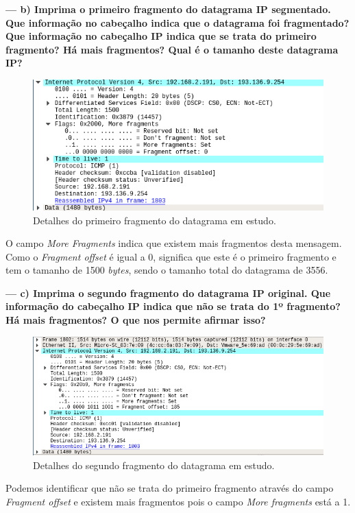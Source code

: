 \documentclass[a4paper]{article}
\begin{document}
\vspace{1cm}

\textbf{--- b) Imprima o primeiro fragmento do datagrama IP segmentado. Que informação no cabeçalho indica que o datagrama foi fragmentado? Que informação no cabeçalho IP indica que se trata do primeiro fragmento? Há mais fragmentos? Qual é o tamanho deste datagrama IP?}\newline
\begin{figure}[!htb]
    \centering
    \includegraphics[scale=0.7]{pic13.png}\newline
    \caption{Detalhes do primeiro fragmento do datagrama em estudo.}
    \label{fig:my_label}
\end{figure}

O campo \textit{More Fragments} indica que existem mais fragmentos desta mensagem. Como o \textit{Fragment offset} é igual a 0, significa que este é o primeiro fragmento e tem o tamanho de 1500 \textit{bytes}, sendo o tamanho total do datagrama de 3556.

\vspace{1cm}
\newpage

\textbf{--- c) Imprima o segundo fragmento do datagrama IP original. Que informação do cabeçalho IP indica que não se trata do 1º fragmento? Há mais fragmentos? O que nos permite afirmar isso?}\newline
\begin{figure}[!htb]
    \centering
    \includegraphics[scale=0.6]{pic14.png}\newline
    \caption{Detalhes do segundo fragmento do datagrama em estudo.}
    \label{fig:my_label}
\end{figure}
Podemos identificar que não se trata do primeiro fragmento através do campo \textit{Fragment offset} e existem mais fragmentos pois o campo \textit{More fragments} está a 1.
\end{document}
